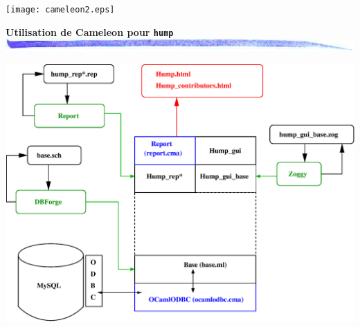 \documentclass[landscape]{seminar}
\def\title#1#2{\noindent
{\bf\large #1}\\
\includegraphics[width=\textwidth]{bar.jpg.eps}
\vspace{#2cm}
}
\def\target#1{\hypertarget{#1}{}}
\begin{document}
\begin{slide}
\target{cam3}
\texttt{[image: cameleon2.eps]}

\end{slide}



\begin{slide}
\title{Utilisation de Cameleon pour {\tt hump}}{0.0}
\target{hump}

\begin{center}
\includegraphics[width=\textwidth]{hump.eps}
\end{center}	

\end{slide}
\end{document}
